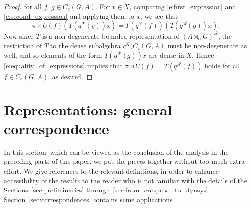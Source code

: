 \documentclass{amsart}
\theoremstyle{plain}
\theoremstyle{definition}
\numberwithin{equation}{section}
\begin{document}
\begin{proof}
for all $f,\,g\in C_c(G,A)$. For $x \in X$, comparing \eqref{e:first_expression} and \eqref{e:second_expression} and applying them to $x$, we see that
\begin{equation}\label{e:equality_of_expressions}
{\pi \rtimes U}(f) \left( T({q^{\mathcal R}}(g))x \right) = T({q^{\mathcal R}}(f)) \left( T({q^{\mathcal R}}(g))x \right).
\end{equation}
Now since $T$ is a non-degenerate bounded representation of ${(A {\rtimes}_\alpha G)^\mathcal{R}}$, the restriction of $T$ to the dense subalgebra ${q^{\mathcal R}}(C_c(G,A)$ must be non-degenerate as well, and so elements of the form $T({q^{\mathcal R}}(g))x$ are dense in $X$. Hence \eqref{e:equality_of_expressions} implies that ${\pi \rtimes U}(f) = T({q^{\mathcal R}}(f))$ holds for all $f\in C_c(G,A)$, as desired.
\end{proof}

\section{Representations: general correspondence}\label{sec:general_correspondence}

In this section, which can be viewed as the conclusion of the analysis in the preceding parts of this paper, we put the pieces together without too much extra effort. We give references to the relevant definitions, in order to enhance accessibility of the results to the reader who is not familiar with the details of the Sections~\ref{sec:preliminaries} through~\ref{sec:from_crosprod_to_dynsys}. Section~\ref{sec:correspondences} contains some applications.
\end{document}
